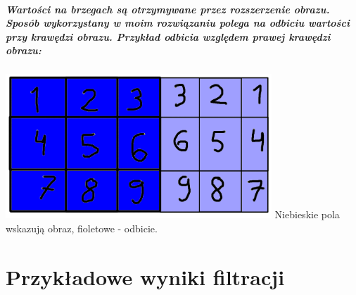 \documentclass[a4paper,12pt,openany]{report}
\begin{document}
\pagebreak
\paragraph{\indent Wartości na brzegach są otrzymywane przez rozszerzenie obrazu. Sposób wykorzystany w moim rozwiązaniu polega na odbiciu wartości przy krawędzi obrazu. Przykład odbicia względem prawej krawędzi obrazu:}

\begin{center}
\includegraphics[width=10cm]{resources/reflect.png}
\linebreak
\tiny{Niebieskie pola wskazują obraz, fioletowe - odbicie.}
\end{center}















\chapter{Przykładowe wyniki filtracji}
\end{document}
